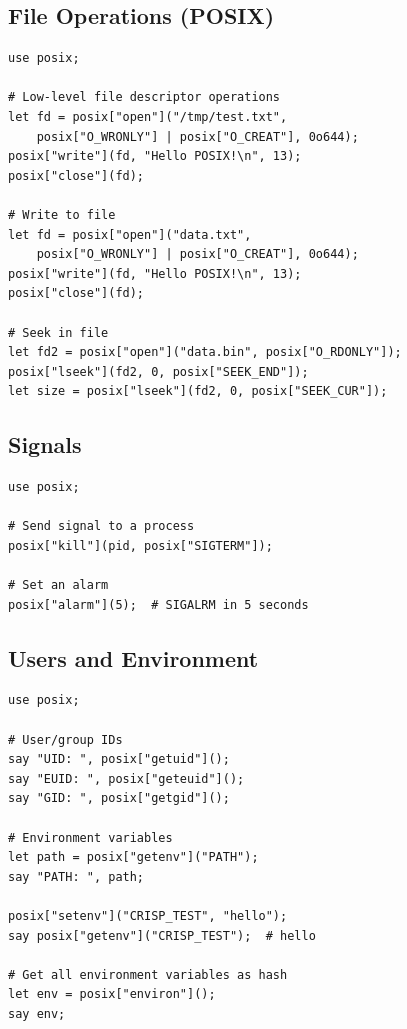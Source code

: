 \subsection{File Operations (POSIX)}

\begin{tcolorbox}[colback=codebg, colframe=darkpurple, colbacktitle=darkpurple, title=\textbf{\textcolor{codegold}{POSIX File Operations}}, fonttitle=\bfseries, sharp corners]
\begin{lstlisting}
use posix;

# Low-level file descriptor operations
let fd = posix["open"]("/tmp/test.txt",
    posix["O_WRONLY"] | posix["O_CREAT"], 0o644);
posix["write"](fd, "Hello POSIX!\n", 13);
posix["close"](fd);

# Write to file
let fd = posix["open"]("data.txt",
    posix["O_WRONLY"] | posix["O_CREAT"], 0o644);
posix["write"](fd, "Hello POSIX!\n", 13);
posix["close"](fd);

# Seek in file
let fd2 = posix["open"]("data.bin", posix["O_RDONLY"]);
posix["lseek"](fd2, 0, posix["SEEK_END"]);
let size = posix["lseek"](fd2, 0, posix["SEEK_CUR"]);
\end{lstlisting}
\end{tcolorbox}

\subsection{Signals}

\begin{tcolorbox}[colback=codebg, colframe=darkpurple, colbacktitle=darkpurple, title=\textbf{\textcolor{codegold}{Signals}}, fonttitle=\bfseries, sharp corners]
\begin{lstlisting}
use posix;

# Send signal to a process
posix["kill"](pid, posix["SIGTERM"]);

# Set an alarm
posix["alarm"](5);  # SIGALRM in 5 seconds
\end{lstlisting}
\end{tcolorbox}

\subsection{Users and Environment}

\begin{tcolorbox}[colback=codebg, colframe=darkpurple, colbacktitle=darkpurple, title=\textbf{\textcolor{codegold}{Users and Environment}}, fonttitle=\bfseries, sharp corners]
\begin{lstlisting}
use posix;

# User/group IDs
say "UID: ", posix["getuid"]();
say "EUID: ", posix["geteuid"]();
say "GID: ", posix["getgid"]();

# Environment variables
let path = posix["getenv"]("PATH");
say "PATH: ", path;

posix["setenv"]("CRISP_TEST", "hello");
say posix["getenv"]("CRISP_TEST");  # hello

# Get all environment variables as hash
let env = posix["environ"]();
say env;
\end{lstlisting}
\end{tcolorbox}

